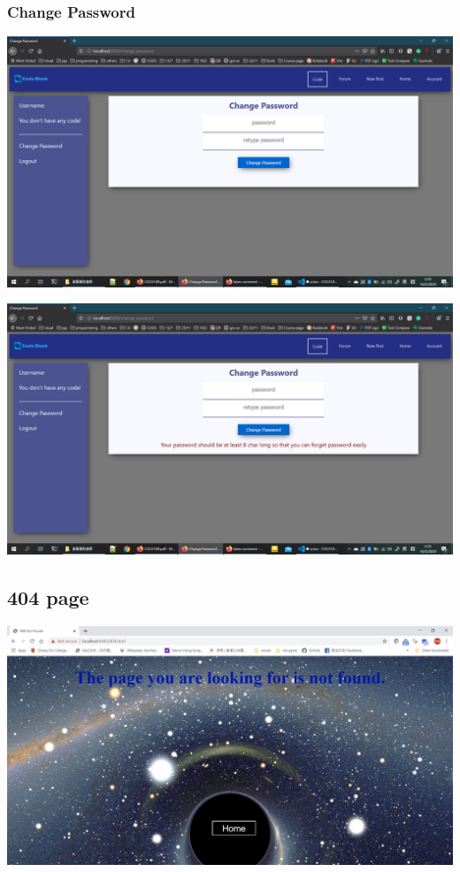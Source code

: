 \subsubsection{Change Password}
\includegraphics[scale=0.4]{Doc/Pics/change_pw_no_msg.png}

\includegraphics[scale=0.4]{Doc/Pics/change_pw_msg.png}

\subsection{404 page}
\includegraphics[scale=0.45]{Doc/Pics/404.jpg}
